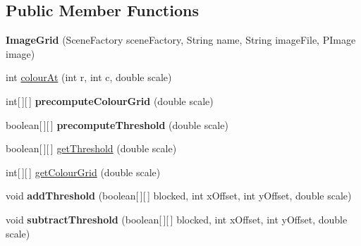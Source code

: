 \subsection*{Public Member Functions}
\begin{DoxyCompactItemize}
\item 
\hypertarget{classdev_1_1boxy_1_1fortyfive_1_1core_1_1image_1_1_image_grid_ac9e99b593590094c15a20fd8d084c8d0}{
{\bfseries ImageGrid} (SceneFactory sceneFactory, String name, String imageFile, PImage image)}
\label{d1/d3a/classdev_1_1boxy_1_1fortyfive_1_1core_1_1image_1_1_image_grid_ac9e99b593590094c15a20fd8d084c8d0}

\item 
int \hyperlink{classdev_1_1boxy_1_1fortyfive_1_1core_1_1image_1_1_image_grid_a4cd3489be964766a6340b48b705a9c1f}{colourAt} (int r, int c, double scale)
\item 
\hypertarget{classdev_1_1boxy_1_1fortyfive_1_1core_1_1image_1_1_image_grid_ac51a05220ac92bcb2c4e6da9ce313c96}{
int\mbox{[}$\,$\mbox{]}\mbox{[}$\,$\mbox{]} {\bfseries precomputeColourGrid} (double scale)}
\label{d1/d3a/classdev_1_1boxy_1_1fortyfive_1_1core_1_1image_1_1_image_grid_ac51a05220ac92bcb2c4e6da9ce313c96}

\item 
\hypertarget{classdev_1_1boxy_1_1fortyfive_1_1core_1_1image_1_1_image_grid_aa48871ef0e6b3f21d26757122d580b9e}{
boolean\mbox{[}$\,$\mbox{]}\mbox{[}$\,$\mbox{]} {\bfseries precomputeThreshold} (double scale)}
\label{d1/d3a/classdev_1_1boxy_1_1fortyfive_1_1core_1_1image_1_1_image_grid_aa48871ef0e6b3f21d26757122d580b9e}

\item 
boolean\mbox{[}$\,$\mbox{]}\mbox{[}$\,$\mbox{]} \hyperlink{classdev_1_1boxy_1_1fortyfive_1_1core_1_1image_1_1_image_grid_acb736f1b047db9c7ec7477351e92376b}{getThreshold} (double scale)
\item 
int\mbox{[}$\,$\mbox{]}\mbox{[}$\,$\mbox{]} \hyperlink{classdev_1_1boxy_1_1fortyfive_1_1core_1_1image_1_1_image_grid_ae677966faa57631d293c72d3468913b9}{getColourGrid} (double scale)
\item 
\hypertarget{classdev_1_1boxy_1_1fortyfive_1_1core_1_1image_1_1_image_grid_aec7109a7d0c53f908d7455a7c3599a5c}{
void {\bfseries addThreshold} (boolean\mbox{[}$\,$\mbox{]}\mbox{[}$\,$\mbox{]} blocked, int xOffset, int yOffset, double scale)}
\label{d1/d3a/classdev_1_1boxy_1_1fortyfive_1_1core_1_1image_1_1_image_grid_aec7109a7d0c53f908d7455a7c3599a5c}

\item 
\hypertarget{classdev_1_1boxy_1_1fortyfive_1_1core_1_1image_1_1_image_grid_a57a305df24ec84f0ec8026443cd7d895}{
void {\bfseries subtractThreshold} (boolean\mbox{[}$\,$\mbox{]}\mbox{[}$\,$\mbox{]} blocked, int xOffset, int yOffset, double scale)}
\label{d1/d3a/classdev_1_1boxy_1_1fortyfive_1_1core_1_1image_1_1_image_grid_a57a305df24ec84f0ec8026443cd7d895}


\end{DoxyCompactItemize}
